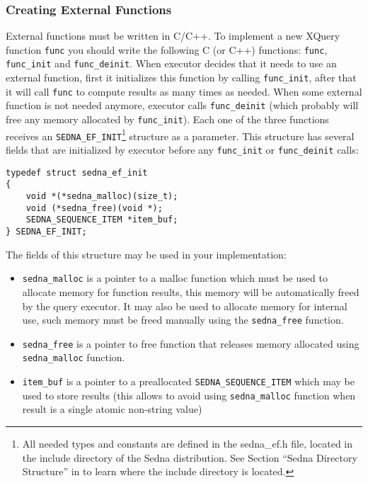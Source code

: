 \documentclass[a4paper,12pt]{article}
\begin{document}
\subsubsection*{Creating External Functions}
External functions must be written in C/C++. To implement a new XQuery function
\verb!func! you should write the following C (or C++) functions: \verb!func!,
\verb!func_init! and \verb!func_deinit!. When executor decides that it needs to
use an external function, first it initializes this function by calling
\verb!func_init!, after that it will call \verb!func! to compute results as many
times as needed. When some external function is not needed anymore, executor
calls \verb!func_deinit! (which probably will free any memory allocated by
\verb!func_init!). Each one of the three functions receives an
\verb!SEDNA_EF_INIT!\footnote{All needed types and constants are defined in the
sedna\_ef.h file, located in the include directory of the Sedna distribution.
See Section ``Sedna Directory Structure'' in \cite{doc:admin} to learn where the
include directory is located.} structure as a parameter. This structure has
several fields that are initialized by executor before any \verb!func_init! or
\verb!func_deinit! calls:
\begin{verbatim}
typedef struct sedna_ef_init
{
    void *(*sedna_malloc)(size_t);
    void (*sedna_free)(void *);
    SEDNA_SEQUENCE_ITEM *item_buf;
} SEDNA_EF_INIT;
\end{verbatim}
The fields of this structure may be used in your implementation:
\begin{itemize}
\item \verb!sedna_malloc! is a pointer to a malloc function which must be used
to allocate memory for function results, this memory will be automatically freed
by the query executor. It may also be used to allocate memory for internal use,
such memory must be freed manually using the \verb!sedna_free! function.
\item \verb!sedna_free! is a pointer to free function that releases memory
allocated using \verb!sedna_malloc! function.
\item \verb!item_buf! is a pointer to a preallocated \verb!SEDNA_SEQUENCE_ITEM!
which may be used to store results (this allows to avoid using
\verb!sedna_malloc! function when result is a single atomic non-string value)
\end{itemize}
\end{document}
